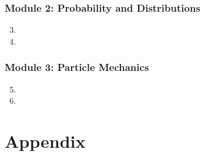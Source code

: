 \documentclass{solutionsmannual}
\begin{document}
\section{Module 2: Probability and Distributions}
\begin{enumerate}[label=\bfseries  \arabic*.]\setcounter{enumi}{2}
\item 
\item 
\end{enumerate}
\section{Module 3: Particle Mechanics}
\begin{enumerate}[label=\bfseries  \arabic*.]\setcounter{enumi}{4}
\item 
\item 
\end{enumerate}

\part{Appendix}
\end{document}
